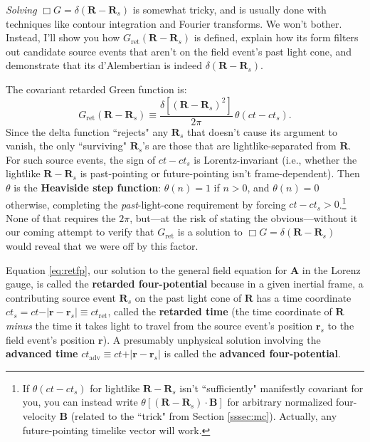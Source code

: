 \documentclass[12pt]{article}
\renewcommand{\vv}[1]{\mathbf{#1}}
\begin{document}
\emph{Solving} $\Box G = \delta ( \vv R - \vv R_{s} )$ is somewhat tricky, and is usually done with techniques like contour integration and Fourier transforms. We won't bother. Instead, I'll show you how $G_{\textrm{ret}}( \vv R - \vv R_{s} )$ is defined, explain how its form filters out candidate source events that aren't on the field event's past light cone, and demonstrate that its d'Alembertian is indeed $\delta ( \vv R - \vv R_{s} )$.

The covariant retarded Green function is:
\begin{equation}\label{eq:green}
G_{\textrm{ret}} (\vv R - \vv R_{s}) \equiv \dfrac{\delta[ (\vv R - \vv R_{s})^2 ]}{2 \pi} \, \theta (ct - ct_{s}).
\end{equation}
Since the delta function ``rejects" any $\vv R_{s}$ that doesn't cause its argument to vanish, the only ``surviving" $\vv R_{s}$'s are those that are lightlike-separated from $\vv R$. For such source events, the sign of $ct - ct_{s}$ is Lorentz-invariant (i.e., whether the lightlike $\vv R - \vv R_{s}$ is past-pointing or future-pointing isn't frame-dependent). Then $\theta$ is the \textbf{Heaviside step function}: $\theta (n) = 1$ if ${n > 0}$, and $\theta (n) = 0$ otherwise, completing the \emph{past}-light-cone requirement by forcing ${ct - ct_{s} > 0}$.\footnote{If $\theta(ct - ct_{s})$ for lightlike $\vv R - \vv R_{s}$ isn't ``sufficiently" manifestly covariant for you, you can instead write $\theta [ (\vv R - \vv R_{s}) \cdot \vv B ]$ for arbitrary normalized four-velocity $\vv B$ (related to the ``trick" from Section \ref{sssec:mc}). Actually, any future-pointing timelike vector will work.} None of that requires the $2 \pi$, but---at the risk of stating the obvious---without it our coming attempt to verify that $G_{\textrm{ret}}$ is a solution to ${\Box G = \delta ( \vv R - \vv R_{s} )}$ would reveal that we were off by this factor.

Equation \ref{eq:retfp}, our solution to the general field equation for $\vv A$ in the Lorenz gauge, is called the \textbf{retarded four-potential} because in a given inertial frame, a contributing source event $\vv R_{s}$ on the past light cone of $\vv R$ has a time coordinate ${ct_{s} = ct - \vert \vv r - \vv r_{s} \vert \equiv ct_{\textrm{ret}}}$, called the \textbf{retarded time} (the time coordinate of $\vv R$ \emph{minus} the time it takes light to travel from the source event's position $\vv r_{s}$ to the field event's position $\vv r$). A presumably unphysical solution involving the \textbf{advanced time} ${ct_{\textrm{adv}} \equiv ct + \vert \vv r - \vv r_{s} \vert}$ is called the \textbf{advanced four-potential}.
\end{document}
